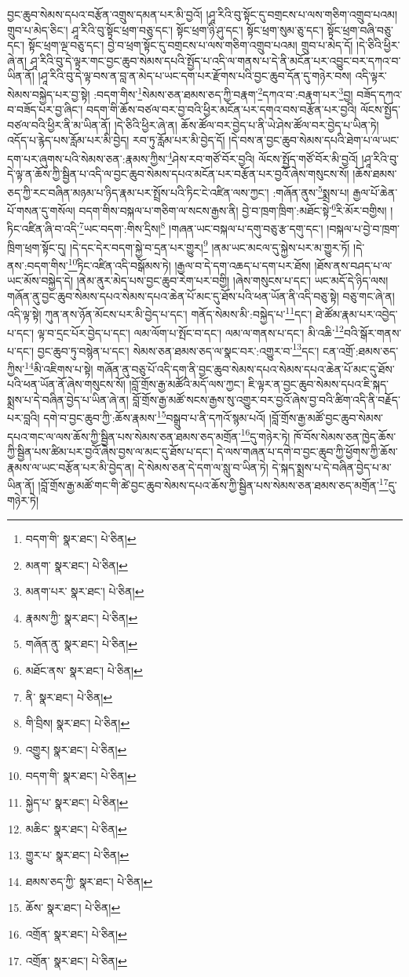 བྱང་ཆུབ་སེམས་དཔའ་བརྩོན་འགྲུས་དམན་པར་མི་བྱའོ། །ཤཱ་རིའི་བུ་སྟོང་དུ་བགྲངས་པ་ལས་གཅིག་འགྲུབ་པའམ། གྲུབ་པ་མེད་ཅིང་། ཤཱ་རིའི་བུ་སྟོང་ཕྲག་བཅུ་དང་། སྟོང་ཕྲག་ཉི་ཤུ་དང་། སྟོང་ཕྲག་སུམ་ཅུ་དང་། སྟོང་ཕྲག་བཞི་བཅུ་དང་། སྟོང་ཕྲག་ལྔ་བཅུ་དང་། བྱེ་བ་ཕྲག་སྟོང་དུ་བགྲངས་པ་ལས་གཅིག་འགྲུབ་པའམ། གྲུབ་པ་མེད་དོ། །དེ་ཅིའི་ཕྱིར་ཞེ་ན། ཤཱ་རིའི་བུ་དེ་ལྟར་གང་བྱང་ཆུབ་སེམས་དཔའི་སྤྱོད་པ་འདི་ལ་གནས་པ་དེ་ནི་མངོན་པར་འབྱུང་བར་དཀའ་བ་ཡིན་ནོ། །ཤཱ་རིའི་བུ་དེ་ལྟ་བས་ན་བླ་ན་མེད་པ་ཡང་དག་པར་རྫོགས་པའི་བྱང་ཆུབ་དོན་དུ་གཉེར་བས། འདི་ལྟར་སེམས་བསྐྱེད་པར་བྱ་སྟེ། :བདག་གིས་\footnote{བདག་གི་  སྣར་ཐང་།  པེ་ཅིན། }སེམས་ཅན་ཐམས་ཅད་ཀྱི་བརྣག་\footnote{མནག་  སྣར་ཐང་།  པེ་ཅིན། }དཀའ་བ་:བརྣག་པར་\footnote{མནག་པར་  སྣར་ཐང་།  པེ་ཅིན། }བྱ། བཟོད་དཀའ་བ་བཟོད་པར་བྱ་ཞིང་། བདག་གི་ཆོས་བཙལ་བར་བྱ་བའི་ཕྱིར་མངོན་པར་དགའ་བས་བརྩོན་པར་བྱའི། ལོངས་སྤྱོད་བཙལ་བའི་ཕྱིར་ནི་མ་ཡིན་ནོ། །དེ་ཅིའི་ཕྱིར་ཞེ་ན། ཆོས་ཚོལ་བར་བྱེད་པ་ནི་ཡེ་ཤེས་ཚོལ་བར་བྱེད་པ་ཡིན་ཏེ། འདོད་པ་རྙེད་པས་རློམ་པར་མི་བྱེད། རབ་ཏུ་རློམ་པར་མི་བྱེད་དོ། །དེ་བས་ན་བྱང་ཆུབ་སེམས་དཔའི་ཐེག་པ་ལ་ཡང་དག་པར་ཞུགས་པའི་སེམས་ཅན་:རྣམས་ཀྱིས་\footnote{རྣམས་ཀྱི་  སྣར་ཐང་།  པེ་ཅིན། }ཤེས་རབ་གཙོ་བོར་བྱའི། ལོངས་སྤྱོད་གཙོ་བོར་མི་བྱའོ། །ཤཱ་རིའི་བུ་དེ་ལྟ་ན་ཆོས་ཀྱི་སྦྱིན་པ་འདི་ལ་བྱང་ཆུབ་སེམས་དཔའ་མངོན་པར་བརྩོན་པར་བྱའོ་ཞེས་གསུངས་སོ། །ཆོས་ཐམས་ཅད་ཀྱི་རང་བཞིན་མཉམ་པ་ཉིད་རྣམ་པར་སྤྲོས་པའི་ཏིང་ངེ་འཛིན་ལས་ཀྱང་། :གཞོན་ནུས་\footnote{གཞོན་ནུ་  སྣར་ཐང་།  པེ་ཅིན། }སྨྲས་པ། རྒྱལ་པོ་ཆེན་པོ་གསན་དུ་གསོལ། བདག་གིས་བསྐལ་པ་གཅིག་ལ་སངས་རྒྱས་ནི། བྱེ་བ་ཁྲག་ཁྲིག་:མཐོང་སྟེ་\footnote{མཐོང་ནས་  སྣར་ཐང་།  པེ་ཅིན། }རི་མོར་བགྱིས། །ཏིང་འཛིན་ཞི་བ་འདི་\footnote{ནི་  སྣར་ཐང་།  པེ་ཅིན། }ཡང་བདག་:གིས་དྲིས།\footnote{གི་བྲིས།  སྣར་ཐང་།  པེ་ཅིན། } །གཞན་ཡང་བསྐལ་པ་དགུ་བཅུ་རྩ་དགུ་དང་། །བསྐལ་པ་བྱེ་བ་ཁྲག་ཁྲིག་ཕྲག་སྟོང་དུ། །དེ་དང་དེར་བདག་སྐྱེ་བ་དྲན་པར་གྱུར།\footnote{འགྱུར།  སྣར་ཐང་།  པེ་ཅིན། } །ནམ་ཡང་མངལ་དུ་སྐྱེས་པར་མ་གྱུར་ཏོ། །དེ་ནས་:བདག་གིས་\footnote{བདག་གི་  སྣར་ཐང་།  པེ་ཅིན། }ཏིང་འཛིན་འདི་བསྒོམས་ཏེ། །རྒྱལ་བ་དེ་དག་འཆད་པ་དག་པར་ཐོས། །ཐོས་ནས་བཤད་པ་ལ་ཡང་མོས་བསྐྱེད་དེ། །ནེམ་ནུར་མེད་པས་བྱང་ཆུབ་རེག་པར་བགྱི། །ཞེས་གསུངས་པ་དང་། ཡང་མདོ་དེ་ཉིད་ལས། གཞོན་ནུ་བྱང་ཆུབ་སེམས་དཔའ་སེམས་དཔའ་ཆེན་པོ་མང་དུ་ཐོས་པའི་ཕན་ཡོན་ནི་འདི་བཅུ་སྟེ། བཅུ་གང་ཞེ་ན། འདི་ལྟ་སྟེ། ཀུན་ནས་ཉོན་མོངས་པར་མི་བྱེད་པ་དང་། གནོད་སེམས་མི་:བསྐྱེད་པ་\footnote{སྐྱེད་པ་  སྣར་ཐང་།  པེ་ཅིན། }དང་། ཐེ་ཚོམ་རྣམ་པར་འབྱེད་པ་དང་། ལྟ་བ་དྲང་པོར་བྱེད་པ་དང་། ལམ་ལོག་པ་སྤོང་བ་དང་། ལམ་ལ་གནས་པ་དང་། མི་འཆི་\footnote{མཆིང་  སྣར་ཐང་།  པེ་ཅིན། }བའི་སྒོར་གནས་པ་དང་། བྱང་ཆུབ་ཏུ་བསྙེན་པ་དང་། སེམས་ཅན་ཐམས་ཅད་ལ་སྣང་བར་:འགྱུར་བ་\footnote{གྱུར་པ་  སྣར་ཐང་།  པེ་ཅིན། }དང་། ངན་འགྲོ་:ཐམས་ཅད་ཀྱིས་\footnote{ཐམས་ཅད་ཀྱི་  སྣར་ཐང་།  པེ་ཅིན། }མི་འཇིགས་པ་སྟེ། གཞོན་ནུ་བཅུ་པོ་འདི་དག་ནི་བྱང་ཆུབ་སེམས་དཔའ་སེམས་དཔའ་ཆེན་པོ་མང་དུ་ཐོས་པའི་ཕན་ཡོན་ནོ་ཞེས་གསུངས་སོ། །བློ་གྲོས་རྒྱ་མཚོའི་མདོ་ལས་ཀྱང་། ཇི་ལྟར་ན་བྱང་ཆུབ་སེམས་དཔའ་ཇི་སྐད་སྨྲས་པ་དེ་བཞིན་བྱེད་པ་ཡིན་ཞེ་ན། བློ་གྲོས་རྒྱ་མཚོ་སངས་རྒྱས་སུ་འགྱུར་བར་བྱའོ་ཞེས་བྱ་བའི་ཚིག་འདི་ནི་བརྗོད་པར་བླའི། དགེ་བ་བྱང་ཆུབ་ཀྱི་:ཆོས་རྣམས་\footnote{ཆོས་  སྣར་ཐང་།  པེ་ཅིན། }བསྒྲུབ་པ་ནི་དཀའོ་སྙམ་པའོ། །བློ་གྲོས་རྒྱ་མཚོ་བྱང་ཆུབ་སེམས་དཔའ་གང་ལ་ལས་ཆོས་ཀྱི་སྦྱིན་པས་སེམས་ཅན་ཐམས་ཅད་མགྲོན་\footnote{འགྲོན་  སྣར་ཐང་།  པེ་ཅིན། }དུ་གཉེར་ཏེ། ཁོ་བོས་སེམས་ཅན་ཁྱེད་ཆོས་ཀྱི་སྦྱིན་པས་ཚིམ་པར་བྱའོ་ཞེས་བྱས་ལ་མང་དུ་ཐོས་པ་དང་། དེ་ལས་གཞན་པ་དགེ་བ་བྱང་ཆུབ་ཀྱི་ཕྱོགས་ཀྱི་ཆོས་རྣམས་ལ་ཡང་བརྩོན་པར་མི་བྱེད་ན། དེ་སེམས་ཅན་དེ་དག་ལ་སླུ་བ་ཡིན་ཏེ། དེ་སྐད་སྨྲས་པ་དེ་བཞིན་བྱེད་པ་མ་ཡིན་ནོ། །བློ་གྲོས་རྒྱ་མཚོ་གང་གི་ཚེ་བྱང་ཆུབ་སེམས་དཔའ་ཆོས་ཀྱི་སྦྱིན་པས་སེམས་ཅན་ཐམས་ཅད་མགྲོན་\footnote{འགྲོན་  སྣར་ཐང་།  པེ་ཅིན། }དུ་གཉེར་ཏེ། 